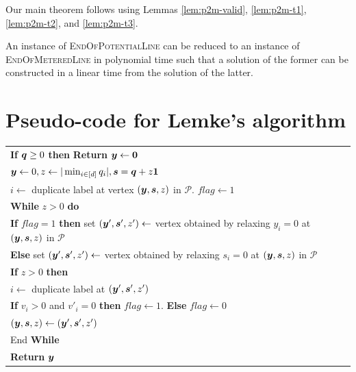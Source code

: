 \documentclass[a4paper,UKenglish]{lipics2}
\theoremstyle{definition}
\def\problem#1{\textsc{#1}}
\def\EOPL{\problem{EndOfPotentialLine}\xspace}
\def\EOML{\problem{EndOfMeteredLine}\xspace}
\newcommand{\CPol}{\mbox{${\mathcal P}$}}
\newcommand{\yy}{\mbox{\boldmath $y$}}
\newcommand{\qq}{\mbox{\boldmath $q$}}
\newcommand{\ones}{\mbox{\boldmath $1$}}
\newcommand{\zeros}{\mbox{\boldmath $0$}}
\newcommand{\ps}{\mbox{\boldmath $s$}}
\begin{document}
Our main theorem follows using Lemmas \ref{lem:p2m-valid}, \ref{lem:p2m-t1}, \ref{lem:p2m-t2}, and \ref{lem:p2m-t3}.

\begin{theorem}\label{thm:p2m}
An instance of \EOPL can be reduced to an instance of \EOML in polynomial time such that a solution of the former can be constructed in a linear time from the solution of the latter. 
\end{theorem}

\section{Pseudo-code for Lemke's algorithm}
\label{app:lemke}

\begin{tabular}{|l|}
\hline
\hspace{5pt} {\bf If} $\qq\ge 0$ {\bf then} {\bf Return} $\yy\leftarrow \zeros$ \\
\hspace{5pt} $\yy\leftarrow 0, z\leftarrow |\min_{i \in [d]} q_i|, \ps=\qq+z\ones$\\
\hspace{5pt} $i\leftarrow $ duplicate label at vertex $(\yy,\ps,z)$ in $\CPol$. $flag\leftarrow 1$ \\
\hspace{5pt} {\bf While} $z>0$ {\bf do}\\
\hspace{10pt} {\bf If} $flag=1$ {\bf then} set $(\yy',\ps',z')\leftarrow $ vertex obtained by relaxing $y_i=0$ at $(\yy,\ps,z)$ in $\CPol$\\
\hspace{10pt} {\bf Else} set $(\yy',\ps',z')\leftarrow $ vertex obtained by relaxing $s_i=0$ at $(\yy,\ps,z)$ in $\CPol$\\
\hspace{10pt} {\bf If} $z>0$ {\bf then}\\
\hspace{15pt} $i \leftarrow $ duplicate label at $(\yy',\ps',z')$\\
\hspace{15pt} {\bf If} $v_i>0$ and $v'_i=0$ {\bf then} $flag\leftarrow 1$. {\bf Else} $flag\leftarrow 0$\\
\hspace{15pt} $(\yy,\ps,z)\leftarrow(\yy',\ps',z')$\\
\hspace{5pt} End {\bf While} \\
\hspace{5pt} {\bf Return} $\yy$\\
\hline
\end{tabular}
\end{document}
